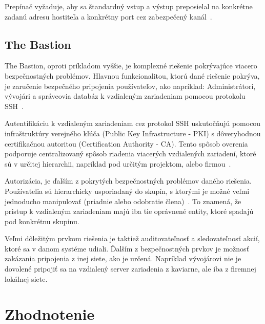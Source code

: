 Prepínač  vyžaduje, aby sa štandardný vstup a výstup preposielal na konkrétne zadanú adresu hostiteľa
a konkrétny port cez zabezpečený kanál~\cite{SshMan}.

\subsection{The Bastion}\label{subsec:the-bastion}

The Bastion, oproti príkladom vyššie, je komplexné riešenie pokrývajúce viacero bezpečnostných problémov.
Hlavnou funkcionalitou, ktorú dané riešenie pokrýva, je zaručenie bezpečného pripojenia používateľov, ako napríklad:
Administrátori, vývojári a správcovia databáz k vzdialeným zariadeniam pomocou protokolu SSH~\cite{BastionOne}.

Autentifikáciu k vzdialeným zariadeniam cez protokol SSH uskutočňujú pomocou infraštruktúry verejného kľúča (Public Key
Infrastructure - PKI) s dôveryhodnou certifikačnou autoritou (Certification Authority - CA).
Tento spôsob overenia podporuje centralizovaný spôsob riadenia viacerých vzdialených zariadení, ktoré sú v určitej
hierarchii, napríklad pod určitým projektom, alebo firmou~\cite{BastionOne}.

Autorizácia, je ďalším z pokrytých bezpečnostných problémov daného riešenia.
Používatelia sú hierarchicky usporiadaný do skupín, s ktorými je možné veľmi jednoducho manipulovať (priadnie alebo
odobratie člena)~\cite{BastionTwo}.
To znamená, že prístup k vzdialeným zariadeniam majú iba tie oprávnené entity, ktoré spadajú pod konkrétnu skupinu.

Veľmi dôležitým prvkom riešenia je taktiež auditovateľnosť a sledovateľnosť akcií, ktoré sa v danom systéme udiali.
Ďalším z bezpečnostných prvkov je možnosť zakázania pripojenia z inej siete, ako je určená.
Napríklad vývojárovi nie je dovolené pripojiť sa na vzdialený server zariadenia z kaviarne, ale iba z firemnej lokálnej siete.

\section{Zhodnotenie}\label{sec:zhodnotenie}

